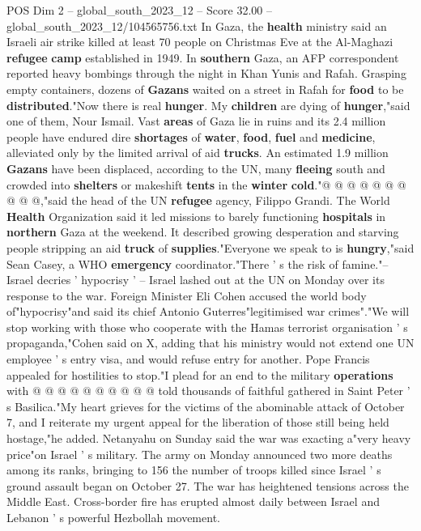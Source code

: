 \begin{textsample}{POS Dim 2 – global\_south\_2023\_12 – Score 32.00 – global\_south\_2023\_12/104565756.txt}
In Gaza, the \textbf{health} ministry said an Israeli air strike killed at least 70 people on Christmas Eve at the Al-Maghazi \textbf{refugee} \textbf{camp} established in 1949.
In \textbf{southern} Gaza, an AFP correspondent reported heavy bombings through the night in Khan Yunis and Rafah.
Grasping empty containers, dozens of \textbf{Gazans} waited on a street in Rafah for \textbf{food} to be \textbf{distributed}."Now there is real \textbf{hunger}.
My \textbf{children} are dying of \textbf{hunger},"said one of them, Nour Ismail.
Vast \textbf{areas} of Gaza lie in ruins and its 2.4 million people have endured dire \textbf{shortages} of \textbf{water}, \textbf{food}, \textbf{fuel} and \textbf{medicine}, alleviated only by the limited arrival of aid \textbf{trucks}.
An estimated 1.9 million \textbf{Gazans} have been displaced, according to the UN, many \textbf{fleeing} south and crowded into \textbf{shelters} or makeshift \textbf{tents} in the \textbf{winter} \textbf{cold}."@ @ @ @ @ @ @ @ @ @,"said the head of the UN \textbf{refugee} agency, Filippo Grandi.
The World \textbf{Health} Organization said it led missions to barely functioning \textbf{hospitals} in \textbf{northern} Gaza at the weekend.
It described growing desperation and starving people stripping an aid \textbf{truck} of \textbf{supplies}."Everyone we speak to is \textbf{hungry},"said Sean Casey, a WHO \textbf{emergency} coordinator."There ' s the risk of famine."-- Israel decries ' hypocrisy ' -- Israel lashed out at the UN on Monday over its response to the war.
Foreign Minister Eli Cohen accused the world body of"hypocrisy"and said its chief Antonio Guterres"legitimised war crimes"."We will stop working with those who cooperate with the Hamas terrorist organisation ' s propaganda,"Cohen said on X, adding that his ministry would not extend one UN employee ' s entry visa, and would refuse entry for another.
Pope Francis appealed for hostilities to stop."I plead for an end to the military \textbf{operations} with @ @ @ @ @ @ @ @ @ @ told thousands of faithful gathered in Saint Peter ' s Basilica."My heart grieves for the victims of the abominable attack of October 7, and I reiterate my urgent appeal for the liberation of those still being held hostage,"he added.
Netanyahu on Sunday said the war was exacting a"very heavy price"on Israel ' s military.
The army on Monday announced two more deaths among its ranks, bringing to 156 the number of troops killed since Israel ' s ground assault began on October 27.
The war has heightened tensions across the Middle East.
Cross-border fire has erupted almost daily between Israel and Lebanon ' s powerful Hezbollah movement.

\end{textsample}
